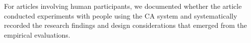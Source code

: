 \documentclass[manuscript,anonymous,sigconf]{acmart}
\begin{document}
For articles involving human participants, we documented whether the article conducted experiments with people using the CA system and systematically recorded the research findings and design considerations that emerged from the empirical evaluations.







\end{document}
